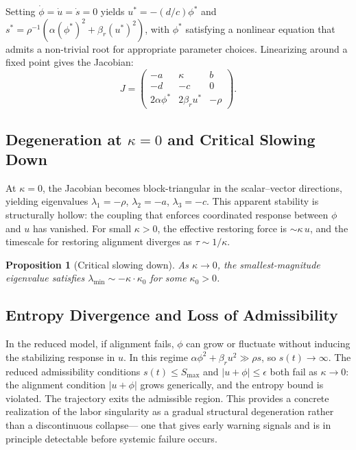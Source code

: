 \documentclass[11pt, a4paper]{article}
\theoremstyle{plain}
\newtheorem{proposition}[theorem]{Proposition}
\theoremstyle{definition}
\newcommand{\coupling}{\kappa}
\begin{document}
Setting $\dot{\phi} = \dot{u} = \dot{s} = 0$ yields $u^* = -(d/c) \phi^*$ and
$s^* = \rho^{-1}(\alpha (\phi^*)^2 + \beta_r (u^*)^2)$, with $\phi^*$
satisfying a nonlinear equation that admits a non-trivial root for appropriate
parameter choices. Linearizing around a fixed point gives the Jacobian:
\[
  J =
  \begin{pmatrix}
    -a & \coupling & b \\
    -d & -c & 0 \\
    2\alpha \phi^* & 2\beta_r u^* & -\rho
  \end{pmatrix}.
\]

\subsection{Degeneration at $\coupling = 0$ and Critical Slowing Down}

At $\coupling = 0$, the Jacobian becomes block-triangular in the scalar--vector
directions, yielding eigenvalues $\lambda_1 = -\rho$, $\lambda_2 = -a$,
$\lambda_3 = -c$. This apparent stability is structurally hollow: the coupling
that enforces coordinated response between $\phi$ and $u$ has vanished. For
small $\coupling > 0$, the effective restoring force is ${\sim}\coupling\, u$,
and the timescale for restoring alignment diverges as $\tau \sim 1/\coupling$.

\begin{proposition}[Critical slowing down]
As $\coupling \to 0$, the smallest-magnitude eigenvalue satisfies
$\lambda_{\min} \sim -\coupling \cdot \kappa_0$ for some $\kappa_0 > 0$.
\end{proposition}

\subsection{Entropy Divergence and Loss of Admissibility}

In the reduced model, if alignment fails, $\phi$ can grow or fluctuate without
inducing the stabilizing response in $u$. In this regime
$\alpha \phi^2 + \beta_r u^2 \gg \rho s$, so $s(t) \to \infty$.
The reduced admissibility conditions $s(t) \leq S_{\max}$ and $|u + \phi| \leq \epsilon$
both fail as $\coupling \to 0$: the alignment condition $|u + \phi|$ grows
generically, and the entropy bound is violated. The trajectory exits the
admissible region. This provides a concrete realization of the labor singularity
as a gradual structural degeneration rather than a discontinuous collapse---
one that gives early warning signals and is in principle detectable before
systemic failure occurs.
\end{document}
